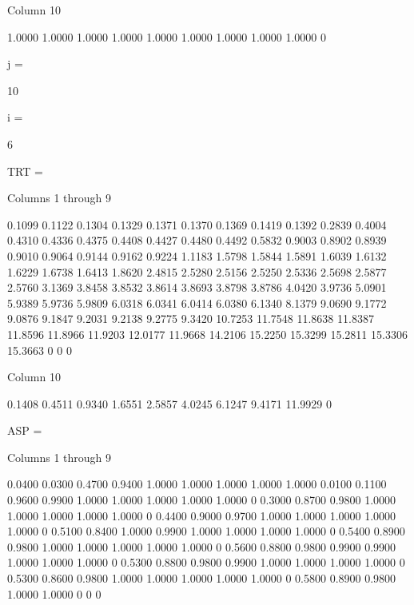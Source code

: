   Column 10

    1.0000
    1.0000
    1.0000
    1.0000
    1.0000
    1.0000
    1.0000
    1.0000
    1.0000
         0


j =

    10


i =

     6


TRT =

  Columns 1 through 9

    0.1099    0.1122    0.1304    0.1329    0.1371    0.1370    0.1369    0.1419    0.1392
    0.2839    0.4004    0.4310    0.4336    0.4375    0.4408    0.4427    0.4480    0.4492
    0.5832    0.9003    0.8902    0.8939    0.9010    0.9064    0.9144    0.9162    0.9224
    1.1183    1.5798    1.5844    1.5891    1.6039    1.6132    1.6229    1.6738    1.6413
    1.8620    2.4815    2.5280    2.5156    2.5250    2.5336    2.5698    2.5877    2.5760
    3.1369    3.8458    3.8532    3.8614    3.8693    3.8798    3.8786    4.0420    3.9736
    5.0901    5.9389    5.9736    5.9809    6.0318    6.0341    6.0414    6.0380    6.1340
    8.1379    9.0690    9.1772    9.0876    9.1847    9.2031    9.2138    9.2775    9.3420
   10.7253   11.7548   11.8638   11.8387   11.8596   11.8966   11.9203   12.0177   11.9668
   14.2106   15.2250   15.3299   15.2811   15.3306   15.3663         0         0         0

  Column 10

    0.1408
    0.4511
    0.9340
    1.6551
    2.5857
    4.0245
    6.1247
    9.4171
   11.9929
         0


ASP =

  Columns 1 through 9

    0.0400    0.0300    0.4700    0.9400    1.0000    1.0000    1.0000    1.0000    1.0000
    0.0100    0.1100    0.9600    0.9900    1.0000    1.0000    1.0000    1.0000    1.0000
         0    0.3000    0.8700    0.9800    1.0000    1.0000    1.0000    1.0000    1.0000
         0    0.4400    0.9000    0.9700    1.0000    1.0000    1.0000    1.0000    1.0000
         0    0.5100    0.8400    1.0000    0.9900    1.0000    1.0000    1.0000    1.0000
         0    0.5400    0.8900    0.9800    1.0000    1.0000    1.0000    1.0000    1.0000
         0    0.5600    0.8800    0.9800    0.9900    0.9900    1.0000    1.0000    1.0000
         0    0.5300    0.8800    0.9800    0.9900    1.0000    1.0000    1.0000    1.0000
         0    0.5300    0.8600    0.9800    1.0000    1.0000    1.0000    1.0000    1.0000
         0    0.5800    0.8900    0.9800    1.0000    1.0000         0         0         0

